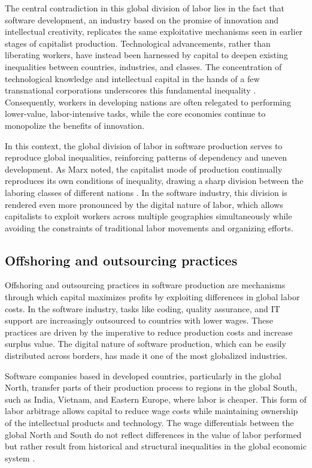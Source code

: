 \begin{refsection}
The central contradiction in this global division of labor lies in the fact that software development, an industry based on the promise of innovation and intellectual creativity, replicates the same exploitative mechanisms seen in earlier stages of capitalist production. Technological advancements, rather than liberating workers, have instead been harnessed by capital to deepen existing inequalities between countries, industries, and classes. The concentration of technological knowledge and intellectual capital in the hands of a few transnational corporations underscores this fundamental inequality \cite[pp.~134-136]{mosco2009}. Consequently, workers in developing nations are often relegated to performing lower-value, labor-intensive tasks, while the core economies continue to monopolize the benefits of innovation.

In this context, the global division of labor in software production serves to reproduce global inequalities, reinforcing patterns of dependency and uneven development. As Marx noted, the capitalist mode of production continually reproduces its own conditions of inequality, drawing a sharp division between the laboring classes of different nations \cite[pp.~482-485]{marx1976}. In the software industry, this division is rendered even more pronounced by the digital nature of labor, which allows capitalists to exploit workers across multiple geographies simultaneously while avoiding the constraints of traditional labor movements and organizing efforts.

\subsection{Offshoring and outsourcing practices}

Offshoring and outsourcing practices in software production are mechanisms through which capital maximizes profits by exploiting differences in global labor costs. In the software industry, tasks like coding, quality assurance, and IT support are increasingly outsourced to countries with lower wages. These practices are driven by the imperative to reduce production costs and increase surplus value. The digital nature of software production, which can be easily distributed across borders, has made it one of the most globalized industries.

Software companies based in developed countries, particularly in the global North, transfer parts of their production process to regions in the global South, such as India, Vietnam, and Eastern Europe, where labor is cheaper. This form of labor arbitrage allows capital to reduce wage costs while maintaining ownership of the intellectual products and technology. The wage differentials between the global North and South do not reflect differences in the value of labor performed but rather result from historical and structural inequalities in the global economic system \cite[pp.~45-47]{smith2016}. 


\end{refsection}
